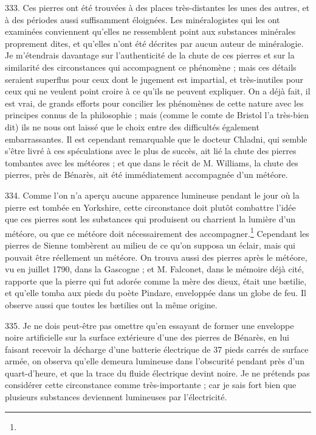\documentclass[a4paper, 11pt, oneside, polutonikogreek, french]{article}
\begin{document}
333. Ces pierres ont été trouvées à des places très-distantes les unes des autres, et à des périodes aussi suffisamment éloignées. Les minéralogistes qui les ont examinées conviennent qu'elles ne ressemblent point aux substances minérales proprement dites, et qu'elles n'ont été décrites par aucun auteur de minéralogie. Je m'étendrais davantage sur l'authenticité de la chute de ces pierres et sur la similarité des circonstances qui accompagnent ce phénomène ; mais ces détails seraient superflus pour ceux dont le jugement est impartial, et très-inutiles pour ceux qui ne veulent point croire à ce qu'ils ne peuvent expliquer. On a déjà fait, il est vrai, de grands efforts pour concilier les phénomènes de cette nature avec les principes connus de la philosophie ; mais (comme le comte de Bristol l'a très-bien dit) ils ne nous ont laissé que le choix entre des difficultés également embarrassantes. Il est cependant remarquable que le docteur Chladni, qui semble s'être livré à ces spéculations avec le plus de succès, ait lié la chute des pierres tombantes avec les météores ; et que dans le récit de M. Williams, la chute des pierres, près de Bénarès, ait été immédiatement accompagnée d'un météore.

334. Comme l'on n'a aperçu aucune apparence lumineuse pendant le jour où la pierre est tombée en Yorkshire, cette circonstance doit plutôt combattre l'idée que ces pierres sont les substances qui produisent ou charrient la lumière d'un météore, ou que ce météore doit nécessairement des accompagner.\footnote{} Cependant les pierres de Sienne tombèrent au milieu de ce qu'on supposa un éclair, mais qui pouvait être réellement un météore. On trouva aussi des pierres après le météore, vu en juillet 1790, dans la Gascogne ; et M. Falconet, dans le mémoire déjà cité, rapporte que la pierre qui fut adorée comme la mère des dieux, était une bætilie, et qu'elle tomba aux pieds du poète Pindare, enveloppée dans un globe de feu. Il observe aussi que toutes les bætilies ont la même origine.

335. Je ne dois peut-être pas omettre qu'en essayant de former une enveloppe noire artificielle sur la surface extérieure d'une des pierres de Bénarès, en lui faisant recevoir la décharge d'une batterie électrique de 37 pieds carrés de surface armée, on observa qu'elle demeura lumineuse dans l'obscurité pendant près d'un quart-d'heure, et que la trace du fluide électrique devint noire. Je ne prétends pas considérer cette circonstance comme très-importante ; car je sais fort bien que plusieurs substances deviennent lumineuses par l'électricité.
\end{document}
